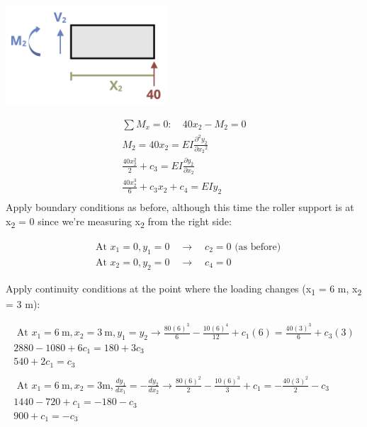 \documentclass[
  letterpaper,
  DIV=11,
  numbers=noendperiod]{scrreprt}
\begin{document}
\begin{tcolorbox}
\begin{tcolorbox}
\begin{center}
\includegraphics[width=2.36458in,height=\textheight]{images/CH11 PNGs/example11.3v2-2.png}
\end{center}

\[
\begin{gathered}  \sum M_x=0: \quad 40 x_2-M_2=0 \\  M_2=40 x_2=EI\frac{\partial^2 y_2}{\partial x_2{ }^2} \\  \frac{40 x_2^2}{2}+c_3=EI \frac{\partial y_2}{\partial x_2} \\  \frac{40 x_2^3}{6}+c_3 x_2+c_4=E I y_2 \\  \end{gathered}
\]Apply boundary conditions as before, although this time the roller
support is at x\textsubscript{2} = 0 since we're measuring
x\textsubscript{2} from the right side:

\[
\begin{aligned} & \text { At } x_1=0, y_1=0 \quad \rightarrow \quad c_2=0 \text { (as before) }\\ & \text { At } x_2=0, y_2=0 \quad \rightarrow \quad c_4=0\end{aligned}
\]

Apply continuity conditions at the point where the loading changes
(x\textsubscript{1} = 6 m, x\textsubscript{2} = 3 m):

\[
\begin{gathered} \text { At } x_1=6 \mathrm{~m}, x_2=3 \mathrm{~m}, y_1=y_2 \rightarrow \frac{80(6)^3}{6}-\frac{10(6)^4}{12}+ c_1(6)=\frac{40(3)^3}{6}+c_3(3) \\ 2880-1080+6 c_1=180+3 c_3 \\ 540+2 c_1=c_3 \\ \\ \text { At } x_1=6 \mathrm{~m},  x_2=3 \mathrm{m}, \frac{d y_1}{d x_1}=-\frac{d y_2}{d x_2} \rightarrow \frac{80(6)^2}{2}-\frac{10(6)^3}{3}+c_1=-\frac{40(3)^2}{2}-c_3 \\ 1440-720+c_1=-180-c_3 \\ 900+c_1=-c_3 \\\end{gathered}
\]


\end{tcolorbox}
\end{tcolorbox}
\end{document}
